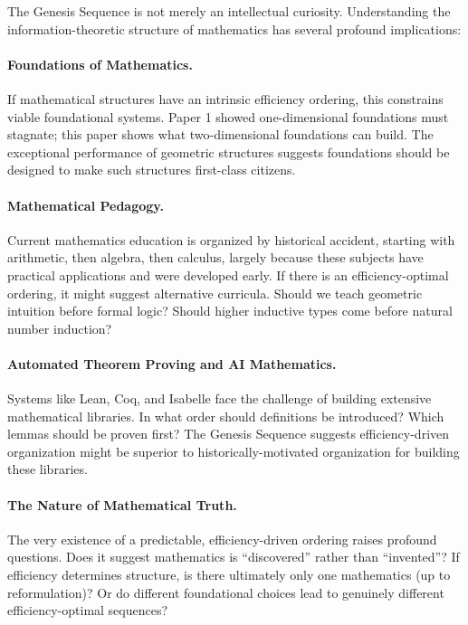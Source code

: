 \documentclass[11pt]{article}
\theoremstyle{definition}
\begin{document}
The Genesis Sequence is not merely an intellectual curiosity. Understanding the information-theoretic structure of mathematics has several profound implications:

\paragraph{Foundations of Mathematics.}

If mathematical structures have an intrinsic efficiency ordering, this constrains viable foundational systems. Paper 1 showed one-dimensional foundations must stagnate; this paper shows what two-dimensional foundations can build. The exceptional performance of geometric structures suggests foundations should be designed to make such structures first-class citizens.

\paragraph{Mathematical Pedagogy.}

Current mathematics education is organized by historical accident, starting with arithmetic, then algebra, then calculus, largely because these subjects have practical applications and were developed early. If there is an efficiency-optimal ordering, it might suggest alternative curricula. Should we teach geometric intuition before formal logic? Should higher inductive types come before natural number induction?

\paragraph{Automated Theorem Proving and AI Mathematics.}

Systems like Lean, Coq, and Isabelle face the challenge of building extensive mathematical libraries. In what order should definitions be introduced? Which lemmas should be proven first? The Genesis Sequence suggests efficiency-driven organization might be superior to historically-motivated organization for building these libraries.

\paragraph{The Nature of Mathematical Truth.}

The very existence of a predictable, efficiency-driven ordering raises profound questions. Does it suggest mathematics is ``discovered'' rather than ``invented''? If efficiency determines structure, is there ultimately only one mathematics (up to reformulation)? Or do different foundational choices lead to genuinely different efficiency-optimal sequences?
\end{document}

